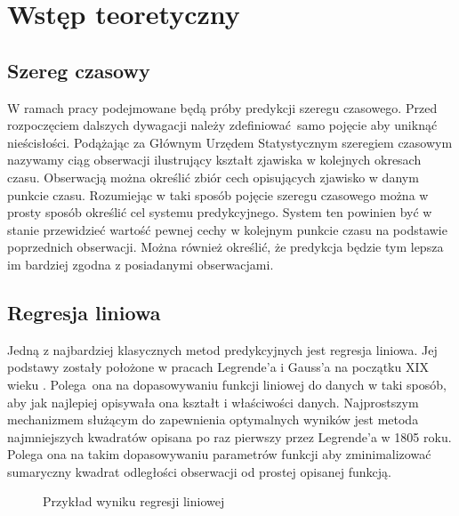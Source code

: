 \documentclass[10pt,a4paper]{article}
\begin{document}
\section{Wstęp teoretyczny}
\subsection{Szereg czasowy}
W ramach pracy podejmowane będą próby predykcji szeregu czasowego. Przed rozpoczęciem dalszych dywagacji należy zdefiniować samo pojęcie aby uniknąć nieścisłości. Podążając za Głównym Urzędem Statystycznym szeregiem czasowym nazywamy ciąg obserwacji ilustrujący kształt zjawiska w kolejnych okresach czasu. Obserwacją można określić zbiór cech opisujących zjawisko w danym punkcie czasu. Rozumiejąc w taki sposób pojęcie szeregu czasowego można w prosty sposób określić cel systemu predykcyjnego. System ten powinien być w stanie przewidzieć wartość pewnej cechy w kolejnym punkcie czasu na podstawie poprzednich obserwacji. Można również określić, że predykcja będzie tym lepsza im bardziej zgodna z posiadanymi obserwacjami. 

\subsection{Regresja liniowa}
Jedną z najbardziej klasycznych metod predykcyjnych jest regresja liniowa. Jej podstawy zostały położone w pracach Legrende'a i Gauss'a na początku XIX wieku \cite{seal1967studies}. Polega ona na dopasowywaniu funkcji liniowej do danych w taki sposób, aby jak najlepiej opisywała ona kształt i właściwości danych. Najprostszym mechanizmem służącym do zapewnienia optymalnych wyników jest metoda najmniejszych kwadratów opisana po raz pierwszy przez Legrende'a w 1805 roku\cite{legendre1806nouvelles}. Polega ona na takim dopasowywaniu parametrów funkcji aby zminimalizować sumaryczny kwadrat odległości obserwacji od prostej opisanej funkcją. 
\begin{figure}[!ht]
	\centering
	\caption{Przykład wyniku regresji liniowej}
\end{figure}
\FloatBarrier
\end{document}
